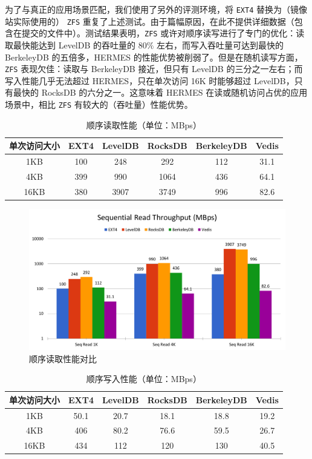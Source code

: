 \documentclass{ctexart}
\begin{document}
为了与真正的应用场景匹配，我们使用了另外的评测环境，将 \texttt{EXT4} 替换为（镜像站实际使用的） \texttt{ZFS} 重复了上述测试。由于篇幅原因，在此不提供详细数据（包含在提交的文件中）。测试结果表明，\texttt{ZFS} 或许对顺序读写进行了专门的优化：读取最快能达到 LevelDB 的吞吐量的 $80\%$ 左右，而写入吞吐量可达到最快的 BerkeleyDB 的五倍多，HERMES 的性能优势被削弱了。但是在随机读写方面，\texttt{ZFS} 表现欠佳：读取与 BerkeleyDB 接近，但只有 LevelDB 的三分之一左右；而写入性能几乎无法超过 HERMES，只在单次访问 16K 时能够超过 LevelDB，只有最快的 RocksDB 的六分之一。这意味着 HERMES 在读或随机访问占优的应用场景中，相比 \texttt{ZFS} 有较大的（吞吐量）性能优势。

\begin{table}[htbp]
\centering
\caption{顺序读取性能（单位：MBps）}
\label{tab:seq-read}
\begin{tabular}{cccccc}
\hline
单次访问大小 & EXT4 & LevelDB & RocksDB & BerkeleyDB & Vedis \\ \hline
1KB     & 100  & 248     & 292     & 112        & 31.1  \\
4KB     & 399  & 990     & 1064    & 436        & 64.1  \\
16KB    & 380  & 3907    & 3749    & 996        & 82.6  \\ \hline
\end{tabular}
\end{table}

\begin{figure}[htbp]
\centering
\caption{顺序读取性能对比}
\label{fig:seq-read}
\includegraphics[page=1,width=\textwidth]{HERMES_perf_plot.pdf}
\end{figure}


\begin{table}[htbp]
\centering
\caption{顺序写入性能（单位：MBps）}
\label{tab:seq-write}
\begin{tabular}{cccccc}
\hline
单次访问大小 & EXT4 & LevelDB & RocksDB & BerkeleyDB & Vedis \\ \hline
1KB     & 50.1 & 20.7    & 18.1    & 18.8       & 19.2  \\
4KB     & 406  & 80.2    & 76.6    & 59.5       & 26.7  \\
16KB    & 434  & 112     & 120     & 130        & 40.5  \\ \hline
\end{tabular}
\end{table}
\end{document}
